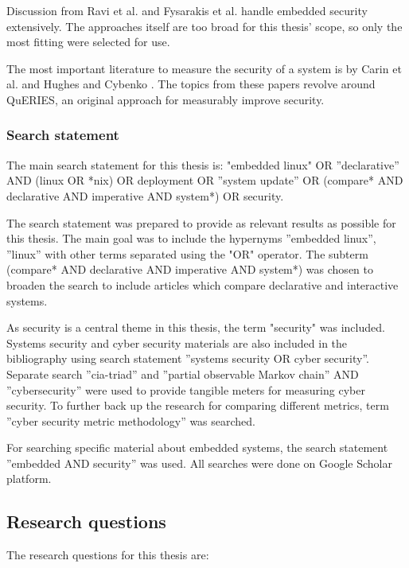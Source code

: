 Discussion from Ravi et al. \cite{ravi2004security} and Fysarakis et
al. \cite{fysarakis2014embedded} handle embedded security
extensively. The approaches itself are too broad for this thesis'
scope, so only the most fitting were selected for use.

The most important literature to measure the security of a system is
by Carin et al. \cite{carin2008cybersecurity} and Hughes and Cybenko
\cite{hughes2013quantitative}. The topics from these papers revolve
around QuERIES, an original approach for measurably improve security.

\subsubsection{Search statement} \label{searchstatement}

The main search statement for this thesis is: "embedded linux" OR
''declarative'' AND (linux OR *nix) OR deployment OR ''system update''
OR (compare* AND declarative AND imperative AND system*) OR security.

The search statement was prepared to provide as relevant results as
possible for this thesis. The main goal was to include the hypernyms
''embedded linux'', ''linux'' with other terms separated using the
"OR" operator. The subterm (compare* AND declarative AND imperative
AND system*) was chosen to broaden the search to include articles
which compare declarative and interactive systems.

As security is a central theme in this thesis, the term "security" was
included. Systems security
and cyber security materials are also included in the bibliography using
search statement ''systems security OR cyber security''. Separate search
''cia-triad'' and ''partial observable Markov chain'' AND
''cybersecurity'' were used to provide tangible meters for measuring
cyber security. To further back up the research for comparing
different metrics, term ''cyber security metric methodology'' was
searched.

For searching specific material about embedded systems, the search
statement ''embedded AND security'' was used. All searches were done on Google Scholar platform.

\subsection{Research questions} \label{resquest}

The research questions for this thesis are:

